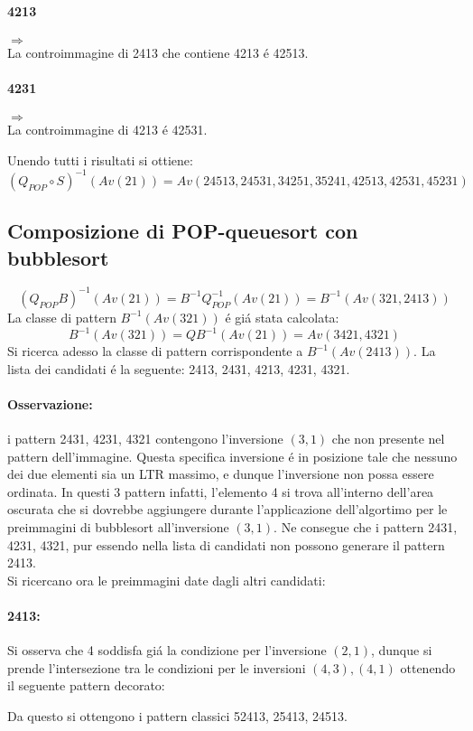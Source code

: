 \paragraph*{4213}\begin{center}$\Rightarrow$\\La controimmagine di 2413 che contiene 4213 \'e 42513.\end{center}
\paragraph*{4231}\begin{center}$\Rightarrow$\\La controimmagine di 4213 \'e 42531.\end{center}
Unendo tutti i risultati si ottiene:$$(Q_{POP}\circ{S})^{-1}(Av(21)) = Av(24513, 24531, 34251, 35241, 42513, 42531, 45231)$$
\subsection*{Composizione di {POP-queuesort} con {bubblesort}}
$$(Q_{POP}{B})^{-1}(Av(21)) = B^{-1}Q_{POP}^{-1}(Av(21))=B^{-1}(Av(321,2413))$$
La classe di pattern $B^{-1}(Av(321))$ \'e gi\'a stata calcolata:
$$B^{-1}(Av(321)) = QB^{-1}(Av(21)) = Av(3421, 4321)$$
Si ricerca adesso la classe di pattern corrispondente a $B^{-1}(Av(2413))$. La lista dei candidati \'e la seguente: 2413, 2431, 4213, 4231, 4321.
\paragraph*{Osservazione:} i pattern 2431, 4231, 4321 contengono l'inversione $(3,1)$ che non presente nel pattern dell'immagine. Questa specifica inversione \'e in posizione tale che nessuno dei due elementi sia un LTR massimo, e dunque l'inversione non possa essere ordinata. In questi 3 pattern infatti, l'elemento 4 si trova all'interno dell'area oscurata che si dovrebbe aggiungere durante l'applicazione dell'algortimo per le preimmagini di bubblesort all'inversione $(3,1)$. Ne consegue che i pattern  2431, 4231, 4321, pur essendo nella lista di candidati non possono generare il pattern 2413.\\
Si ricercano ora le preimmagini date dagli altri candidati:
\paragraph*{2413:}Si osserva che 4 soddisfa gi\'a la condizione per l'inversione $(2,1)$, dunque si prende l'intersezione tra le condizioni per le inversioni $(4,3),(4,1)$ ottenendo il seguente pattern decorato:
\begin{center}
\end{center}
Da questo si ottengono i pattern classici 52413, 25413, 24513.
